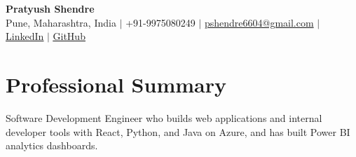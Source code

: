 \documentclass[a4paper,11pt]{article}
\begin{document}
\begin{center}
  {\Large\bfseries Pratyush Shendre}\\[2pt]
  \small Pune, Maharashtra, India $|$ +91-9975080249 $|$
  \href{mailto:pshendre6604@gmail.com}{pshendre6604@gmail.com} $|$
  \href{https://www.linkedin.com/in/pratyush-shendre-2256a7223/}{\underline{LinkedIn}} $|$
  \href{https://github.com/PratyushS04}{\underline{GitHub}}
\end{center}

\section{Professional Summary}
\small Software Development Engineer who builds web applications and internal developer tools with React, Python, and Java on Azure, and has built Power BI analytics dashboards.
\end{document}
